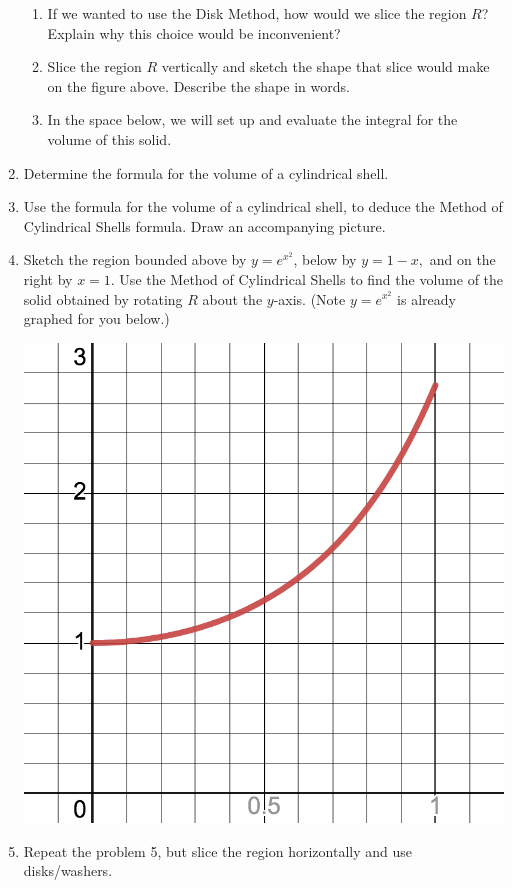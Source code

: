\documentclass[11pt,fleqn]{article}
\begin{document}
\begin{enumerate}
\begin{enumerate}
\item If we wanted to use the Disk Method, how would we slice the region $R$? Explain why this choice would be inconvenient?

\vspace{.6in}

\item Slice the region $R$ vertically and sketch the shape that slice would make on the figure above. Describe the shape in words.\\

\vspace{.6in}

\item In the space below, we will set up and evaluate the integral for the volume of this solid.

\vfill

\end{enumerate}
\newpage
\item Determine the formula for the volume of a cylindrical shell.
\vspace{1in}
\item Use the formula for the volume of a cylindrical shell, to deduce the Method of Cylindrical Shells formula. Draw an accompanying picture.
\vfill
\item Sketch the region bounded above by $y=e^{x^2}$, below by $y=1-x,$ and on the right by $x=1.$ Use the Method of Cylindrical Shells to find the volume of the solid obtained by rotating $R$ about the $y$-axis. (Note $y=e^{x^2}$ is already graphed for you below.)

\includegraphics[scale=0.2]{pic-2-3-b.png} 
\vfill
\item Repeat the problem 5, but slice the region horizontally and use disks/washers. 
\vspace{1in}

\end{enumerate}
\end{document}

